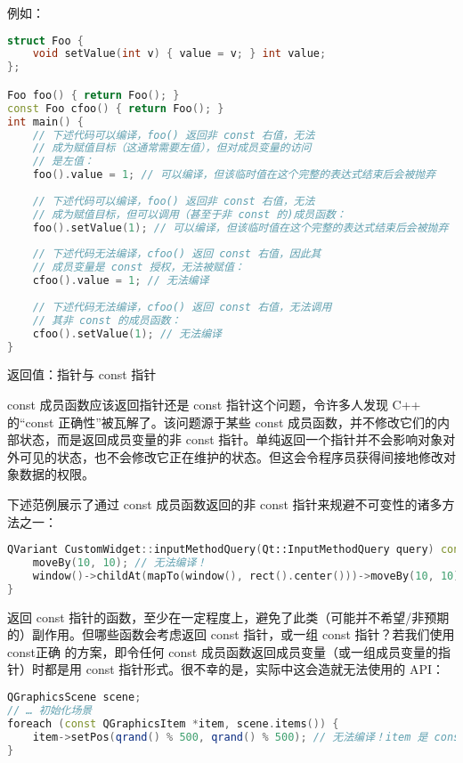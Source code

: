 例如：

\begin{lstlisting}[language=C++]
struct Foo {
	void setValue(int v) { value = v; } int value;
};

Foo foo() { return Foo(); }
const Foo cfoo() { return Foo(); }
int main() {
	// 下述代码可以编译，foo() 返回非 const 右值，无法
	// 成为赋值目标（这通常需要左值），但对成员变量的访问
	// 是左值：
	foo().value = 1; // 可以编译，但该临时值在这个完整的表达式结束后会被抛弃
	
	// 下述代码可以编译，foo() 返回非 const 右值，无法
	// 成为赋值目标，但可以调用（甚至于非 const 的)成员函数：
	foo().setValue(1); // 可以编译，但该临时值在这个完整的表达式结束后会被抛弃
	
	// 下述代码无法编译，cfoo() 返回 const 右值，因此其
	// 成员变量是 const 授权，无法被赋值：
	cfoo().value = 1; // 无法编译
	
	// 下述代码无法编译，cfoo() 返回 const 右值，无法调用
	// 其非 const 的成员函数：
	cfoo().setValue(1); // 无法编译
}
\end{lstlisting}

返回值：指针与 const 指针

const 成员函数应该返回指针还是 const 指针这个问题，令许多人发现 C++ 的“const 正确性”被瓦解了。该问题源于某些 const 成员函数，并不修改它们的内部状态，而是返回成员变量的非 const 指针。单纯返回一个指针并不会影响对象对外可见的状态，也不会修改它正在维护的状态。但这会令程序员获得间接地修改对象数据的权限。

下述范例展示了通过 const 成员函数返回的非 const 指针来规避不可变性的诸多方法之一：

\begin{lstlisting}[language=C++]
QVariant CustomWidget::inputMethodQuery(Qt::InputMethodQuery query) const {
	moveBy(10, 10); // 无法编译！
	window()->childAt(mapTo(window(), rect().center()))->moveBy(10, 10); // 可以编译！
}
\end{lstlisting}

返回 const 指针的函数，至少在一定程度上，避免了此类（可能并不希望/非预期的）副作用。但哪些函数会考虑返回 const 指针，或一组 const 指针？若我们使用 const正确 的方案，即令任何 const 成员函数返回成员变量（或一组成员变量的指针）时都是用 const 指针形式。很不幸的是，实际中这会造就无法使用的 API：

\begin{lstlisting}[language=C++]
QGraphicsScene scene;
// … 初始化场景
foreach (const QGraphicsItem *item, scene.items()) {
	item->setPos(qrand() % 500, qrand() % 500); // 无法编译！item 是 const 指针
}
\end{lstlisting}

